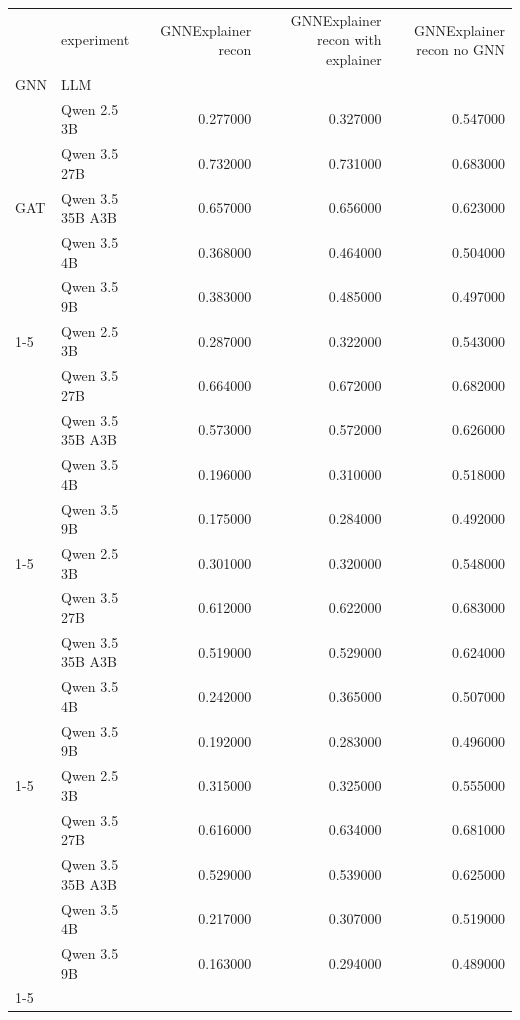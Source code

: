 \begin{tabular}{llrrr}
\toprule
 & experiment & GNNExplainer recon & GNNExplainer recon with explainer & GNNExplainer recon no GNN \\
GNN & LLM &  &  &  \\
\midrule
\multirow[t]{5}{*}{GAT} & Qwen 2.5 3B & 0.277000 & 0.327000 & 0.547000 \\
 & Qwen 3.5 27B & 0.732000 & 0.731000 & 0.683000 \\
 & Qwen 3.5 35B A3B & 0.657000 & 0.656000 & 0.623000 \\
 & Qwen 3.5 4B & 0.368000 & 0.464000 & 0.504000 \\
 & Qwen 3.5 9B & 0.383000 & 0.485000 & 0.497000 \\
\cline{1-5}
\multirow[t]{5}{*}{GCN} & Qwen 2.5 3B & 0.287000 & 0.322000 & 0.543000 \\
 & Qwen 3.5 27B & 0.664000 & 0.672000 & 0.682000 \\
 & Qwen 3.5 35B A3B & 0.573000 & 0.572000 & 0.626000 \\
 & Qwen 3.5 4B & 0.196000 & 0.310000 & 0.518000 \\
 & Qwen 3.5 9B & 0.175000 & 0.284000 & 0.492000 \\
\cline{1-5}
\multirow[t]{5}{*}{GIN} & Qwen 2.5 3B & 0.301000 & 0.320000 & 0.548000 \\
 & Qwen 3.5 27B & 0.612000 & 0.622000 & 0.683000 \\
 & Qwen 3.5 35B A3B & 0.519000 & 0.529000 & 0.624000 \\
 & Qwen 3.5 4B & 0.242000 & 0.365000 & 0.507000 \\
 & Qwen 3.5 9B & 0.192000 & 0.283000 & 0.496000 \\
\cline{1-5}
\multirow[t]{5}{*}{GraphSAGE} & Qwen 2.5 3B & 0.315000 & 0.325000 & 0.555000 \\
 & Qwen 3.5 27B & 0.616000 & 0.634000 & 0.681000 \\
 & Qwen 3.5 35B A3B & 0.529000 & 0.539000 & 0.625000 \\
 & Qwen 3.5 4B & 0.217000 & 0.307000 & 0.519000 \\
 & Qwen 3.5 9B & 0.163000 & 0.294000 & 0.489000 \\
\cline{1-5}
\bottomrule
\end{tabular}
